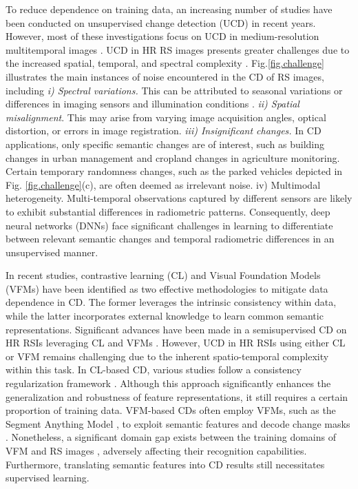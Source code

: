 To reduce dependence on training data, an increasing number of studies have been conducted on unsupervised change detection (UCD) in recent years. However, most of these investigations focus on UCD in medium-resolution multitemporal images \cite{chen2021self}. UCD in HR RS images presents greater challenges due to the increased spatial, temporal, and spectral complexity \cite{bruzzone2012novel}. Fig.\ref{fig.challenge} illustrates the main instances of noise encountered in the CD of RS images, including \textit{i) Spectral variations.} This can be attributed to seasonal variations or differences in imaging sensors and illumination conditions \cite{hong2018augmented}. \textit{ii) Spatial misalignment}. This may arise from varying image acquisition angles, optical distortion, or errors in image registration. \textit{iii) Insignificant changes.} In CD applications, only specific semantic changes are of interest, such as building changes in urban management and cropland changes in agriculture monitoring. Certain temporary randomness changes, such as the parked vehicles depicted in Fig. \ref{fig.challenge}(c), are often deemed as irrelevant noise. iv) Multimodal heterogeneity. Multi-temporal observations captured by different sensors are likely to exhibit substantial differences in radiometric patterns. Consequently, deep neural networks (DNNs) face significant challenges in learning to differentiate between relevant semantic changes and temporal radiometric differences in an unsupervised manner.
 
In recent studies, contrastive learning (CL) \cite{sohn2020fixmatch} and Visual Foundation Models (VFMs) \cite{Kirillov2023Segment} have been identified as two effective methodologies to mitigate data dependence in CD. The former leverages the intrinsic consistency within data, while the latter incorporates external knowledge to learn common semantic representations. Significant advances have been made in a semisupervised CD on HR RSIs leveraging CL \cite{yang2023revisiting, chen2022self} and VFMs \cite{ding2024samcd, zheng2024segment}. However, UCD in HR RSIs using either CL or VFM remains challenging due to the inherent spatio-temporal complexity within this task. In CL-based CD, various studies follow a consistency regularization framework \cite{sohn2020fixmatch}. Although this approach significantly enhances the generalization and robustness of feature representations, it still requires a certain proportion of training data. VFM-based CDs often employ VFMs, such as the Segment Anything Model \cite{Kirillov2023Segment}, to exploit semantic features and decode change masks \cite{zheng2024segment}. Nonetheless, a significant domain gap exists between the training domains of VFM and RS images \cite{ji2024segment}, adversely affecting their recognition capabilities. Furthermore, translating semantic features into CD results still necessitates supervised learning.

